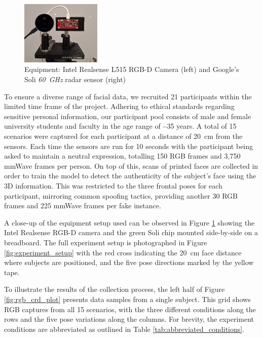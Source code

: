 \documentclass{mpaper}
\begin{document}
\begin{figure}[b!]
    \centering
    \vspace{-0.45cm}
    \includegraphics[width=0.34\textwidth,decodearray={1 1 1 1 1 1}]{figures/equipment.pdf}
    \vspace{0.1cm}
    \caption{Equipment: Intel Realsense L515 RGB-D Camera (left) and Google's Soli \textit{\qty{60}{\GHz}} radar sensor (right)}
    \label{fig:equipment}
    \vspace{-0.5cm}
\end{figure}

To ensure a diverse range of facial data, we recruited 21 participants within the limited time frame of the project. Adhering to ethical standards regarding sensitive personal information, our participant pool consists of male and female university students and faculty in the age range of \textbf{--}35 years. A total of 15 scenarios were captured for each participant at a distance of \qty{20}{\cm} from the sensors. Each time the sensors are run for 10 seconds with the participant being asked to maintain a neutral expression, totalling 150 RGB frames and 3,750 mmWave frames per person. On top of this, scans of printed faces are collected in order to train the model to detect the authenticity of the subject's face using the 3D information. This was restricted to the three frontal poses for each participant, mirroring common spoofing tactics, providing another 30 RGB frames and 225 mmWave frames per fake instance.

A close-up of the equipment setup used can be observed in Figure \ref{fig:equipment} showing the Intel Realsense RGB-D camera and the green Soli chip mounted side-by-side on a breadboard. The full experiment setup is photographed in Figure \ref{fig:experiment_setup} with the red cross indicating the \qty{20}{\cm} face distance where subjects are positioned, and the five pose directions marked by the yellow tape.

To illustrate the results of the collection process, the left half of Figure \ref{fig:rgb_crd_plot} presents data samples from a single subject. This grid shows RGB captures from all 15 scenarios, with the three different conditions along the rows and the five pose variations along the columns. For brevity, the experiment conditions are abbreviated as outlined in Table \ref{tab:abbreviated_conditions}.
\end{document}
